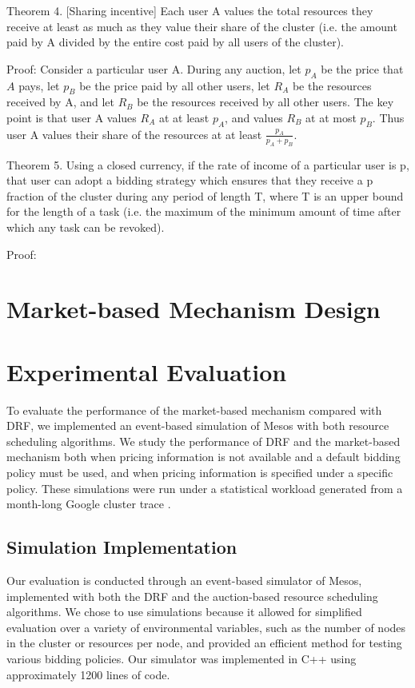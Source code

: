 \documentclass{acm_proc_article-sp}
\begin{document}
Theorem 4. [Sharing incentive] Each user A values the total resources they receive at least as much as they value their share of the cluster (i.e. the amount paid by A divided by the entire cost paid by all users of the cluster).

Proof: Consider a particular user A. During any auction, let $p_A$ be the price that $A$ pays, 
let $p_B$ be the price paid by all other users, let $R_A$ be the resources received by A, and let $R_B$ be the resources received by all other users. The key point is that user A values $R_A$ at at least $p_A$, and values $R_B$ at at most $p_B$. Thus user A values their share of the resources at at least $\frac {p_A}{p_A + p_B}$.


Theorem 5. Using a closed currency, if the rate of income of a particular user is p, that user can adopt a bidding strategy which ensures that they receive a p fraction of the cluster during any period of length T, where T is an upper bound for the length of a task (i.e. the maximum of the minimum amount of time after which any task can be revoked).

Proof: 

\section{Market-based Mechanism Design}
\label{sec:design}

\section{Experimental Evaluation}
\label{sec:eval}

To evaluate the performance of the market-based mechanism compared with DRF,
we implemented an event-based simulation of Mesos with both resource scheduling algorithms.
We study the performance of DRF and the market-based mechanism both when pricing information is not available and a default bidding policy must be used, and when pricing information is specified under a specific policy. These simulations were run under a statistical workload generated from a month-long Google cluster trace \cite{TODO}.

\subsection{Simulation Implementation\\}

Our evaluation is conducted through an event-based simulator of Mesos, implemented with both the DRF and the auction-based resource scheduling algorithms. We chose to use simulations because it allowed for simplified evaluation over a variety of environmental variables, such as the number of nodes in the cluster or resources per node, and provided an efficient method for testing various bidding policies. Our simulator was implemented in C++ using approximately 1200 lines of code.
\end{document}
